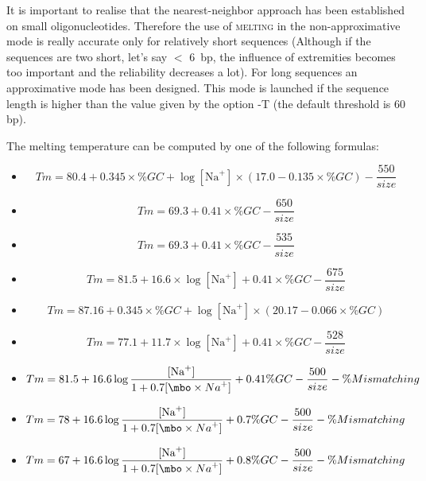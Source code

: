 \documentclass{article}
\begin{document}
It is important to realise that the nearest-neighbor approach has been established  
on small oligonucleotides. Therefore the use of \textsc{melting} in the non-approximative  
mode is really accurate only for relatively short sequences (Although if the sequences are 
two short, let's say $<$ 6~bp, the influence of extremities becomes too important and the  
reliability decreases a lot). For long sequences an approximative mode has been designed. 
This mode is launched if the sequence length is higher than the value given by the option -T 
(the default threshold is 60 bp).
 
The melting temperature can be computed by one of the following formulas:   
\begin{itemize}
\item \te{}
\begin{displaymath}
Tm = 80.4 + 0.345 \times \%GC + \log[\mbox{Na}^+] \times (17.0 - 0.135 \times \%GC) - \frac{550}{size}
\end{displaymath}
\item \te{}
\begin{displaymath}
Tm = 69.3 + 0.41 \times \%GC - \frac{650}{size}
\end{displaymath}
\item \te{}
\begin{displaymath}
Tm = 69.3 + 0.41 \times \%GC - \frac{535}{size}
\end{displaymath}
\item \te{}
\begin{displaymath}
Tm = 81.5 + 16.6 \times \log[\mbox{Na}^+] + 0.41 \times \%GC - \frac{675}{size}
\end{displaymath}
\item \te{}
\begin{displaymath}
Tm = 87.16 + 0.345 \times \%GC + \log[\mbox{Na}^+] \times (20.17 - 0.066 \times \%GC)
\end{displaymath}
\item \te{}
\begin{displaymath}
Tm = 77.1 + 11.7 \times \log[\mbox{Na}^+] + 0.41 \times \%GC - \frac{528}{size}
\end{displaymath}
\item \te{}
\begin{displaymath}
Tm = 81.5 + 16.6\log\frac{[\mbox{Na}^+]}{1+0.7[\mbo\times{Na}^+]} + 0.41\% GC - \frac{500}{size} 
- \%Mismatching
\end{displaymath}
\item \te{}
\begin{displaymath}
Tm = 78 + 16.6\log\frac{[\mbox{Na}^+]}{1+0.7[\mbo\times{Na}^+]} + 0.7\% GC - \frac{500}{size}
- \%Mismatching
\end{displaymath}
\item \te{}
\begin{displaymath}
Tm = 67 + 16.6\log\frac{[\mbox{Na}^+]}{1+0.7[\mbo\times{Na}^+]} + 0.8\% GC - \frac{500}{size}
- \%Mismatching
\end{displaymath}
\end{itemize}
\end{document}

